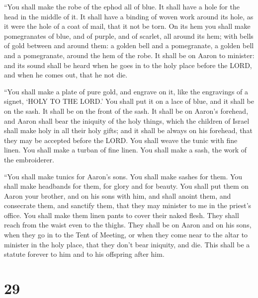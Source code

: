  ``You shall make the robe of the ephod all of blue.
 It shall have a hole for the head in the middle of it. It
shall have a binding of woven work around its hole, as it were the hole
of a coat of mail, that it not be torn.  On its hem you
shall make pomegranates of blue, and of purple, and of scarlet, all
around its hem; with bells of gold between and around them:
 a golden bell and a pomegranate, a golden bell and a
pomegranate, around the hem of the robe.  It shall be on
Aaron to minister: and its sound shall be heard when he goes in to the
holy place before the LORD, and when he comes out, that he not die.

 ``You shall make a plate of pure gold, and engrave on it,
like the engravings of a signet, `HOLY TO THE LORD.'  You
shall put it on a lace of blue, and it shall be on the sash. It shall be
on the front of the sash.  It shall be on Aaron's forehead,
and Aaron shall bear the iniquity of the holy things, which the children
of Israel shall make holy in all their holy gifts; and it shall be
always on his forehead, that they may be accepted before the LORD.
 You shall weave the tunic with fine linen. You shall make
a turban of fine linen. You shall make a sash, the work of the
embroiderer.

 ``You shall make tunics for Aaron's sons. You shall make
sashes for them. You shall make headbands for them, for glory and for
beauty.  You shall put them on Aaron your brother, and on
his sons with him, and shall anoint them, and consecrate them, and
sanctify them, that they may minister to me in the priest's office.
 You shall make them linen pants to cover their naked
flesh. They shall reach from the waist even to the thighs. 
They shall be on Aaron and on his sons, when they go in to the Tent of
Meeting, or when they come near to the altar to minister in the holy
place, that they don't bear iniquity, and die. This shall be a statute
forever to him and to his offspring after him.

\hypertarget{section-28}{%
\section{29}\label{section-28}}

